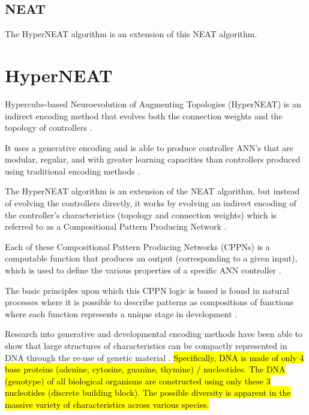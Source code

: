 \subsection{NEAT}

The HyperNEAT algorithm is an extension of this NEAT algorithm. 

\cite{StanleyMiikkulainen2002}


\section{HyperNEAT}

Hypercube-based Neuroevolution of Augmenting Topologies (HyperNEAT) is an indirect encoding method that evolves both the connection weights and the topology of controllers \cite{stanley2009hypercube}.

It uses a generative encoding and is able to produce controller ANN's that are modular, regular, and with greater learning capacities than controllers produced using traditional encoding methods \cite{tonelli2013relationships}.

The HyperNEAT algorithm is an extension of the NEAT algorithm, but instead of evolving the controllers directly, it works by evolving an indirect encoding of the controller's characteristics (topology and connection weights) which is referred to as a Compositional Pattern Producing Network \cite{stanley2009hypercube}.

Each of these Compositional Pattern Producing Networks (CPPNs) is a computable function that produces an output (corresponding to a given input), which is used to define the various properties of a specific ANN controller \cite{clune2009evolving, hausknecht2012hyperneat}.

The basic principles upon which this CPPN logic is based is found in natural processes where it is possible to describe patterns as compositions of functions where each function represents a unique stage in development \cite{DAmbrosioStanley2008}.

Research into generative and developmental encoding methods have been able to show that large structures of characteristics can be compactly represented in DNA through the re-use of genetic material \cite{stanley2009hypercube}.
\hl{Specifically, DNA is made of only 4 base proteins (adenine, cytosine, guanine, thymine) / nucleotides. The DNA (genotype) of all biological organisms are constructed using only these 3 nucleotides (discrete building block). The possible diversity is apparent in the massive variety of characteristics across various species.}

